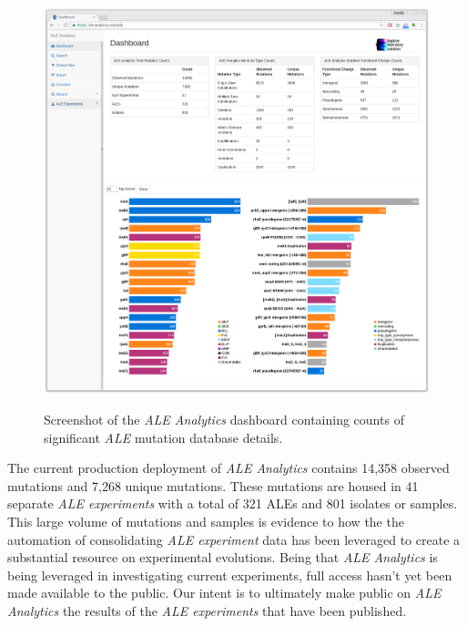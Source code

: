 \documentclass[12pt,final,masters,chapterheads]{ucsd}  %
\begin{document}
\begin{figure}[H]
  \caption{Screenshot of the \textit{ALE Analytics} dashboard containing counts of significant \textit{ALE} mutation database details.}
  \centering
  \includegraphics[width=1\textwidth]{dashboard_screenshot.png}
  \label{fig:dashboard_screenshot}
\end{figure}

The current production deployment of \textit{ALE Analytics} contains 14,358 observed mutations and 7,268 unique mutations. These mutations are housed in 41 separate \textit{ALE experiments} with a total of 321 ALEs and 801 isolates or samples. This large volume of mutations and samples is evidence to how the the automation of consolidating \textit{ALE experiment} data has been leveraged to create a substantial resource on experimental evolutions. Being that \textit{ALE Analytics} is being leveraged in investigating current experiments, full access hasn't yet been made available to the public. Our intent is to ultimately make public on \textit{ALE Analytics} the results of the \textit{ALE experiments} that have been published.

% 
% 
\end{document}
